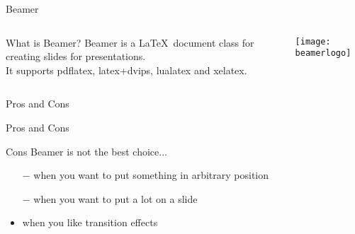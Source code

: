 \graphicspath{{sec02/images/}{sec02/code/}}
\lstset{inputpath=sec02/code/}


\begin{frame}[t]{Beamer}
    \begin{columns}
    \begin{column}{0.65\textwidth}
        \begin{block}{What is Beamer?}
            Beamer is a \LaTeX\ document class for creating slides for presentations. \\
            It supports pdflatex, latex+dvips, lualatex and xelatex.
        \end{block}
    \end{column}
    \begin{column}{0.3\textwidth}
        \begin{center}
            \texttt{[image: beamerlogo]}
        \end{center}
    \end{column}
    \end{columns}
\end{frame}

\begin{frame}{Pros and Cons}

\Huge\centering Pros and Cons
     
\end{frame}

\begin{frame}{Cons}\relax
    Beamer is \alert{not} the best choice...
     \begin{itemize}
        \item[$-$] when you want to put something in {\csk arbitrary position} %
        \item[$-$] when you want to put {\csk a lot} on a slide %
        \item<2>[$-$] when you like {\csk transition} effects
    \end{itemize}
\end{frame}

